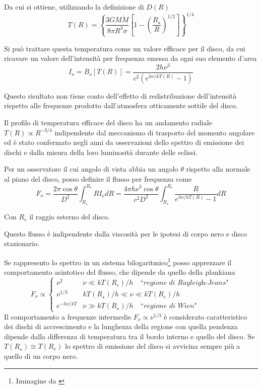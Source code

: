 \documentclass[a4paperbi]{article}
\begin{document}
	Da cui si ottiene, utilizzando la definizione di $D(R)$
	\begin{equation}
		T(R)=\left\{\frac{3GM\dot{M}}{8\pi R^3\sigma}\left[1-\left(\frac{R_{\star}}{R}\right)^{1/2}\right]\right\}^{1/4}
	\end{equation}
	
	Si può trattare questa temperatura come un valore efficace per il disco, da cui ricavare un valore dell'intensità per frequenza emessa da ogni suo elemento d'area
	\begin{equation}
		I_\nu=B_\nu[T(R)]=\frac{2h\nu^3}{c^2(e^{h\nu/kT(R)}-1)}
	\end{equation}
	
	Questo risultato non tiene conto dell'effetto di redistribuzione dell'intensità rispetto alle frequenze prodotto dall'atmosfera otticamente sottile del disco.

	Il profilo di temperatura efficace del disco ha un andamento radiale $T(R)\propto R^{-3/4}$ indipendente dal meccanismo di trasporto del momento angolare ed è stato confermato negli anni da osservazioni dello spettro di emissione dei dischi e dalla misura della loro luminosità durante delle eclissi.
	
	Per un osservatore il cui angolo di vista abbia un angolo $\theta$ rispetto alla normale al piano del disco, posso definire il flusso per frequenza come
	\begin{equation}
		F_\nu=\frac{2\pi \cos{\theta}}{D^2}\int^{R_{e}}_{R_{\star}}RI_\nu dR=\frac{4\pi h\nu^3\cos{\theta}}{c^2D^2}\int^{R_{e}}_{R_{\star}}\frac{R}{e^{h\nu/kT(R)}-1}dR
	\end{equation}
	
	Con $R_e$ il raggio esterno del disco.
	
	Questo flusso è indipendente dalla viscosità per le ipotesi di corpo nero e disco stazionario.

	Se rappresento lo spettro in un sistema bilogaritmico\footnote{Immagine da \cite{GhiselliniRadiativi}} posso apprezzare il comportamento asintotico del flusso, che dipende da quello della plankiana
	\begin{equation}
		F_\nu\propto\begin{cases}
						\nu^2 & \nu\ll kT(R_{e})/h \quad\textit{``regione di Rayleigh-Jeans"}\\
						\nu^{1/3} & kT(R_{\star})/h\ll\nu\ll kT(R_{e})/h\\
						e^{-h\nu/kT} & \nu\gg kT(R_{\star})/h\quad\textit{``regione di Wien"}						
					\end{cases}
	\end{equation}
	Il comportamento a frequenze intermedie $F_\nu\propto\nu^{1/3}$ è considerato caratteristico dei dischi di accrescimento e la lunghezza della regione con quella pendenza dipende dalla differenza di temperatura tra il bordo interno e quello del disco. Se $T(R_{\star})\cong T(R_{e})$ lo spettro di emissione del disco si avvicina sempre più a quello di un corpo nero.
	
\end{document}
